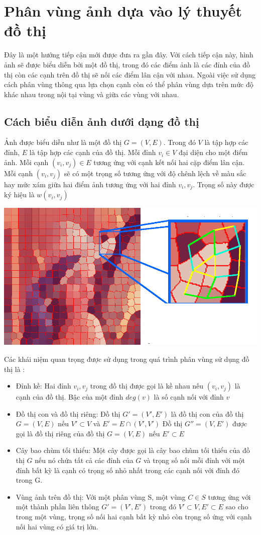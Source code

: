 \documentclass[14pt,oneside,a4paper]{extreport}
\begin{document}
\section{Phân vùng ảnh dựa vào lý thuyết đồ thị}
Đây là một hướng tiếp cận mới được đưa ra gần đây. Với cách tiếp cận này, hình ảnh sẽ được biểu diễn bởi một đồ thị, trong đó các điểm ảnh là các đỉnh của đồ thị còn các cạnh trên đồ thị sẽ nối các điểm lân cận với nhau. Ngoài việc sử dụng cách phân vùng thông qua lựa chọn cạnh còn có thể phân vùng dựa trên mức độ khác nhau trong nội tại vùng và giữa các vùng với nhau.
\subsection{Cách biểu diễn ảnh dưới dạng đồ thị}
Ảnh được biểu diễn như là một đồ thị $G=(V,E)$. Trong đó $V$ là tập hợp các đỉnh, $E$ là tập hợp các cạnh của đồ thị. Mỗi đỉnh $v_i\in V$ đại diện cho một điểm ảnh. Mỗi cạnh $(v_i,v_j)\in E$ tương ứng với cạnh kết nối hai cặp điểm lân cận. Mỗi cạnh $(v_i,v_j)$ sẽ có một trọng số tương ứng với độ chênh lệch về màu sắc hay mức xám giữa hai điểm ảnh tương ứng với hai đỉnh $v_i, v_j $. Trọng số này được ký hiệu là $w(v_i, v_j)$
\begin{center}
\includegraphics[scale=0.3]{figure/graphbased.png}
\end{center}
Các khái niệm quan trọng được sử dụng trong quá trình phân vùng sử dụng đồ thị là :
\begin{itemize}
\item Đỉnh kề: Hai đỉnh $v_i, v_j$ trong đồ thị được gọi là kề nhau nếu $(v_i,v_j)$ là cạnh của đồ thị. Bậc của một đỉnh $deg(v)$ là số cạnh nối với đỉnh $v$
\item Đồ thị con và đồ thị riêng:
Đồ thị $G'=(V',E')$ là đồ thị con của đồ thị $G=(V,E)$ nếu $V' \subset V$ và $E'=E\cap (V',V')$ 
Đồ thị  $G''=(V,E')$ được gọi là đồ thị riêng của đồ thị $G=(V,E)$ nếu $E'\subset E$
\item Cây bao chùm tối thiểu: Một cây được gọi là cây bao chùm tối thiểu của đồ thị $G$  nếu nó chứa tất cả các đỉnh của $G$ và trọng số nối mỗi đỉnh với một đỉnh bất kỳ là cạnh có trọng số nhỏ nhất trong các cạnh nối với đỉnh đó trong G. 
\item Vùng ảnh trên đồ thị: Với một phân vùng S, một vùng $C\in S$ tương ứng với một thành phần liên thông $G'=(V', E')$ trong đó  $V'\subset V, E' \subset E$ sao cho trong một vùng, trọng số nối hai cạnh bất kỳ nhỏ còn trọng số ứng với cạnh nối hai vùng có giá trị lớn.
\end{itemize}
\end{document}
